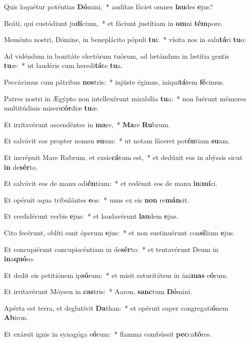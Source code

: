 \item Quis loquétur poténtias \textbf{Dó}mini,~* audítas fáciet omnes \textbf{lau}des \textbf{e}jus?
\item Beáti, qui custódiunt ju\textbf{dí}cium,~* et fáciunt justítiam in \textbf{om}ni \textbf{tém}pore.
\item Meménto nostri, Dómine, in beneplácito pópuli \textbf{tu}i:~* vísita nos in salu\textbf{tá}ri \textbf{tu}o:
\item Ad vidéndum in bonitáte electórum tuórum, ad lætándum in lætítia gentis \textbf{tu}æ:~* ut laudéris cum heredi\textbf{tá}te \textbf{tu}a.
\item Peccávimus cum pátribus \textbf{nos}tris:~* injúste égimus, iniqui\textbf{tá}tem \textbf{fé}cimus.
\item Patres nostri in Ægýpto non intellexérunt mirabília \textbf{tu}a:~* non fuérunt mémores multitúdinis miseri\textbf{cór}diæ \textbf{tu}æ.
\item Et irritavérunt ascendéntes in \textbf{ma}re,~* \textbf{Ma}re \textbf{Ru}brum.
\item Et salvávit eos propter nomen \textbf{su}um:~* ut notam fáceret pot\textbf{én}tiam \textbf{su}am.
\item Et incrépuit Mare Rubrum, et exsic\textbf{cá}tum est,~* et dedúxit eos in abýssis sicut \textbf{in} de\textbf{sér}to.
\item Et salvávit eos de manu odi\textbf{én}tium:~* et redémit eos de manu \textbf{in}i\textbf{mí}ci.
\item Et opéruit aqua tribulántes \textbf{e}os:~* unus ex eis \textbf{non} re\textbf{mán}sit.
\item Et credidérunt verbis \textbf{e}jus:~* et laudavérunt \textbf{lau}dem \textbf{e}jus.
\item Cito fecérunt, oblíti sunt óperum \textbf{e}jus:~* et non sustinuérunt con\textbf{sí}lium \textbf{e}jus.
\item Et concupiérunt concupiscéntiam in de\textbf{sér}to:~* et tentavérunt Deum in \textbf{in}a\textbf{quó}so.
\item Et dedit eis petitiónem ip\textbf{só}rum:~* et misit saturitátem in áni\textbf{mas} e\textbf{ó}rum.
\item Et irritavérunt Móysen in \textbf{cas}tris:~* Aaron, \textbf{sanc}tum \textbf{Dó}mini.
\item Apérta est terra, et deglutívit \textbf{Da}than:~* et opéruit super congregati\textbf{ó}nem \textbf{Ab}iron.
\item Et exársit ignis in synagóga e\textbf{ó}rum:~* flamma combússit \textbf{pec}ca\textbf{tó}res.
